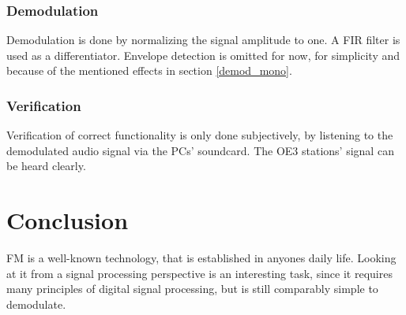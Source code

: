 \documentclass[conference]{IEEEtran}
\begin{document}
    \subsubsection{Demodulation}
      Demodulation is done by normalizing the signal amplitude to one.
      A FIR filter is used as a differentiator.
      Envelope detection is omitted for now, for simplicity and because of the mentioned effects in section \ref{demod_mono}.
    \subsubsection{Verification}
      Verification of correct functionality is only done subjectively, by listening to the demodulated audio signal via the PCs' soundcard.
      The OE3 stations' signal can be heard clearly.

\section{Conclusion}
  FM is a well-known technology, that is established in anyones daily life.
  Looking at it from a signal processing perspective is an interesting task, since it requires many principles of digital signal processing, but is still comparably simple to demodulate.

%
%

\end{document}
